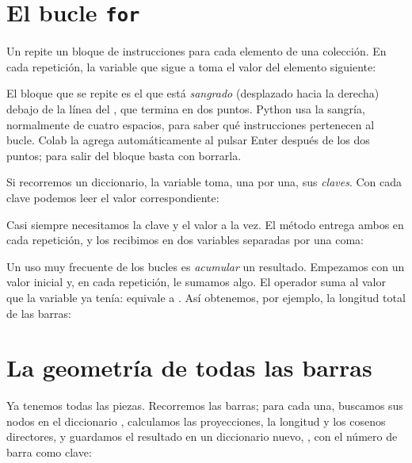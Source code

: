 \section{El bucle \texttt{for}}\label{sec:for}

Un   repite un bloque de instrucciones para cada
elemento de una colección. En cada repetición, la variable que sigue a
 toma el valor del elemento siguiente:

\begin{python}
El bloque que se repite es el que está \emph{sangrado} (desplazado hacia la
derecha) debajo de la línea del , que termina en dos puntos. Python
usa la sangría, normalmente de cuatro espacios, para saber qué instrucciones
pertenecen al bucle. Colab la agrega automáticamente al pulsar Enter después
de los dos puntos; para salir del bloque basta con borrarla.
\end{python}

Si recorremos un diccionario, la variable toma, una por una, sus
\emph{claves}. Con cada clave podemos leer el valor correspondiente:

Casi siempre necesitamos la clave y el valor a la vez. El método
 entrega ambos en cada repetición, y los recibimos en dos
variables separadas por una coma:

Un uso muy frecuente de los bucles es \emph{acumular} un resultado. Empezamos
con un valor inicial y, en cada repetición, le sumamos algo. El operador
\py{+=} suma al valor que la variable ya tenía:  equivale a
. Así obtenemos, por ejemplo, la longitud total de las barras:

\section{La geometría de todas las barras}\label{sec:geometria_todas}

Ya tenemos todas las piezas. Recorremos las barras; para cada una, buscamos
sus nodos en el diccionario , calculamos las proyecciones, la
longitud y los cosenos directores, y guardamos el resultado en un diccionario
nuevo, , con el número de barra como clave:

